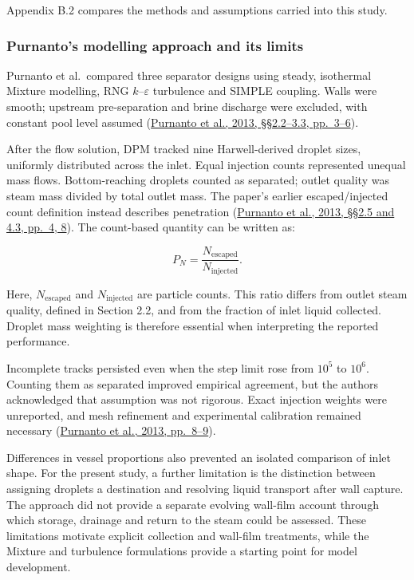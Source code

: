 \documentclass[12pt]{article}
\begin{document}
Appendix B.2 compares the methods and assumptions carried into this study.

\subsubsection{Purnanto's modelling approach and its limits}\label{purnantos-modelling-approach-and-its-limits}

Purnanto et al.~compared three separator designs using steady, isothermal Mixture modelling, RNG \(k\)--\(\varepsilon\) turbulence and SIMPLE coupling. Walls were smooth; upstream pre-separation and brine discharge were excluded, with constant pool level assumed (\href{https://www.researchgate.net/publication/269519626_CFD_MODELLING_OF_TWO-PHASE_FLOW_INSIDE_GEOTHERMAL_STEAM-WATER_SEPARATORS}{Purnanto et al., 2013, §§2.2--3.3, pp.~3--6}).

After the flow solution, DPM tracked nine Harwell-derived droplet sizes, uniformly distributed across the inlet. Equal injection counts represented unequal mass flows. Bottom-reaching droplets counted as separated; outlet quality was steam mass divided by total outlet mass. The paper's earlier escaped/injected count definition instead describes penetration (\href{https://www.researchgate.net/publication/269519626_CFD_MODELLING_OF_TWO-PHASE_FLOW_INSIDE_GEOTHERMAL_STEAM-WATER_SEPARATORS}{Purnanto et al., 2013, §§2.5 and 4.3, pp.~4, 8}). The count-based quantity can be written as:

\[
P_N=\frac{N_{\mathrm{escaped}}}{N_{\mathrm{injected}}}.
\]

Here, \(N_{\mathrm{escaped}}\) and \(N_{\mathrm{injected}}\) are particle counts. This ratio differs from outlet steam quality, defined in Section 2.2, and from the fraction of inlet liquid collected. Droplet mass weighting is therefore essential when interpreting the reported performance.

Incomplete tracks persisted even when the step limit rose from \(10^5\) to \(10^6\). Counting them as separated improved empirical agreement, but the authors acknowledged that assumption was not rigorous. Exact injection weights were unreported, and mesh refinement and experimental calibration remained necessary (\href{https://www.researchgate.net/publication/269519626_CFD_MODELLING_OF_TWO-PHASE_FLOW_INSIDE_GEOTHERMAL_STEAM-WATER_SEPARATORS}{Purnanto et al., 2013, pp.~8--9}).

Differences in vessel proportions also prevented an isolated comparison of inlet shape. For the present study, a further limitation is the distinction between assigning droplets a destination and resolving liquid transport after wall capture. The approach did not provide a separate evolving wall-film account through which storage, drainage and return to the steam could be assessed. These limitations motivate explicit collection and wall-film treatments, while the Mixture and turbulence formulations provide a starting point for model development.
\end{document}

